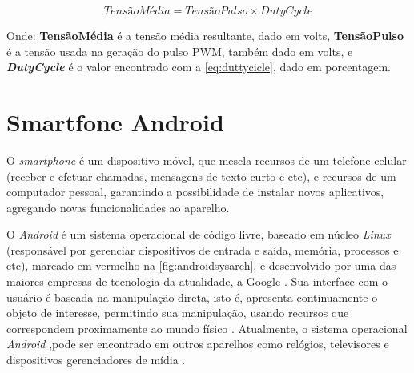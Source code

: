 \begin{equation}
{TensãoMédia} = {TensãoPulso} \times {DutyCycle}
\label{eq:avervoltage}
\end{equation}

Onde: \textbf{TensãoMédia} é a tensão média resultante, dado em volts, \textbf{TensãoPulso} é a tensão usada na geração do pulso PWM, também dado em volts, e \textbf{\textit{DutyCycle}} é o valor encontrado com a \autoref{eq:duttycicle}, dado em porcentagem.

\section{Smartfone Android}
\label{sec:android}

O \textit{smartphone} é um dispositivo móvel, que mescla recursos de um telefone celular (receber e efetuar chamadas, mensagens de texto curto e etc), e recursos de um computador pessoal, garantindo a possibilidade de instalar novos aplicativos, agregando novas funcionalidades ao aparelho.\par

O \textit{Android} é um sistema operacional de código livre, baseado em núcleo \textit{Linux} (responsável por gerenciar dispositivos de entrada e saída, memória, processos e etc), marcado em vermelho na \autoref{fig:androidsysarch}, e desenvolvido por uma das maiores empresas de tecnologia da atualidade, a Google . Sua interface com o usuário é baseada na manipulação direta, isto é, apresenta continuamente o objeto de interesse, permitindo sua manipulação, usando recursos que correspondem proximamente ao mundo físico . Atualmente, o sistema operacional \textit{Android} ,pode ser encontrado em outros aparelhos como relógios, televisores e dispositivos gerenciadores de mídia . \par

